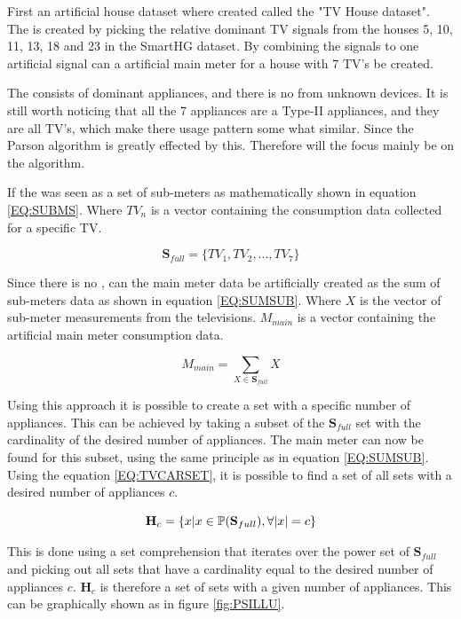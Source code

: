 First an artificial house dataset where created called the "TV House dataset". The  is created by picking the relative dominant TV signals from the houses 5, 10, 11, 13, 18 and 23 in the SmartHG dataset. By combining the signals to one artificial signal can a artificial main meter for a house with 7 TV's be created. 

The  consists of dominant appliances, and there is no  from unknown devices. It is still worth noticing that all the 7 appliances are a Type-II appliances, and they are all TV's, which make there usage pattern some what similar. Since the Parson algorithm is greatly effected by this. Therefore will the focus mainly be on the  algorithm. 

If the  was seen as a set of sub-meters as mathematically shown in equation \ref{EQ:SUBMS}. Where $TV_n$ is a vector containing the consumption data collected for a specific TV.

\begin{equation}
	\textbf{S}_{full} = \{ TV_1, TV_2, ... , TV_7 \}
	\label{EQ:SUBMS}
\end{equation}

Since there is no , can the main meter data be artificially created as the sum of sub-meters data as shown in equation \ref{EQ:SUMSUB}. Where $X$ is the vector of sub-meter measurements from the televisions. $M_{main}$ is a vector containing the artificial main meter consumption data. 

\begin{equation}
	M_{main} = \sum_{X \in \textbf{S}_{full}}X
	\label{EQ:SUMSUB}
\end{equation}

Using this approach it is possible to create a set with a specific number of appliances. This can be achieved by taking a subset of the $\textbf{S}_{full}$ set with the cardinality of the desired number of appliances. The main meter can now be found for this subset, using the same principle as in equation \ref{EQ:SUMSUB}. Using the equation \ref{EQ:TVCARSET}, it is possible to find a set of all sets with a desired number of appliances $c$.

\begin{equation}
	\textbf{H}_c = \{ x | x \in \mathbb{P}(\textbf{S}_{full}), \forall |x| = c   \}
	\label{EQ:TVCARSET}
\end{equation}

This is done using a set comprehension that iterates over the power set of $\textbf{S}_{full}$ and picking out all sets that have a cardinality equal to the desired number of appliances $c$. $\textbf{H}_c$ is therefore a set of sets with a given number of appliances. This can be graphically shown as in figure \ref{fig:PSILLU}. 

